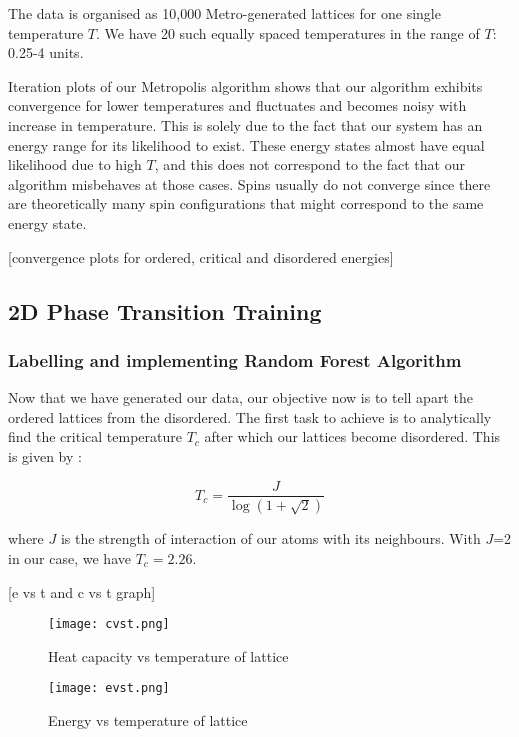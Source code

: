 The data is organised as 10,000 Metro-generated lattices for one single temperature $T$. We have 20 such equally spaced temperatures in the range of $T$: 0.25-4 units.

Iteration plots of our Metropolis algorithm shows that our algorithm exhibits convergence for lower temperatures and fluctuates and becomes noisy with increase in temperature. This is solely due to the fact that our system has an energy range for its likelihood to exist. These energy states almost have equal likelihood due to high $T$, and this does not correspond to the fact that our algorithm misbehaves at those cases. Spins usually do not converge since there are theoretically many spin configurations that might correspond to the same energy state.

[convergence plots for ordered, critical and disordered energies]

\subsection{2D Phase Transition Training}

\subsubsection{Labelling and implementing Random Forest Algorithm}

Now that we have generated our data, our objective now is to tell apart the ordered lattices from the disordered. The first task to achieve is to analytically find the critical temperature $T_c$ after which our lattices become disordered. This is given by \cite{onsager1944crystal}:

\[T_c=\frac{J}{\log(1+\sqrt{2})}\]

where $J$ is the strength of interaction of our atoms with its neighbours. With $J$=2 in our case, we have $T_c=2.26$.

[e vs t and c vs t graph]

\begin{figure}[h!]
    \centering
    \texttt{[image: cvst.png]}
    \caption{Heat capacity vs temperature of lattice}
\end{figure}

\begin{figure}[h!]
    \centering
    \texttt{[image: evst.png]}
    \caption{Energy vs temperature of lattice}
\end{figure}



